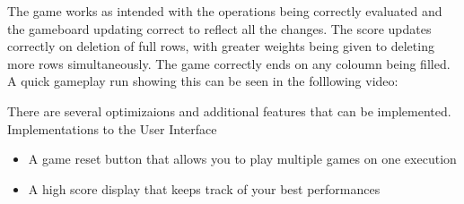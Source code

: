 The game works as intended with the operations being correctly evaluated and the gameboard updating correct to reflect all the changes. The score updates correctly on deletion of full rows, with greater weights 
being given to deleting more rows simultaneously. The game correctly ends on any coloumn being filled. \\
A quick gameplay run showing this can be seen in the folllowing video: 

There are several optimizaions and additional features that can be implemented. Implementations to the User Interface
\begin{itemize}
    \item A game reset button that allows you to play multiple games on one execution
    \item A high score display that keeps track of your best performances
\end{itemize} 

